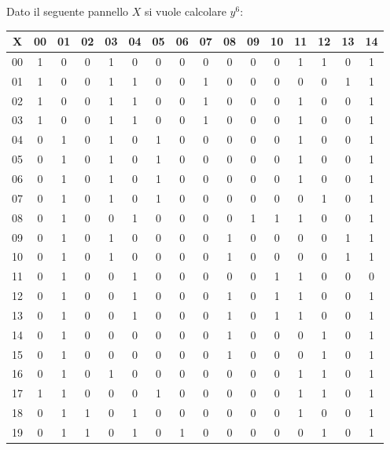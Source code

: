 \newpage
\begin{esempio}
  \label{es:pbwt1}
  Dato il seguente pannello $X$ si vuole calcolare $y^6$:
  \begin{table}[H]
    \centering
    \scriptsize
    \begin{tabular}{c|ccccccccccccccc}
      X & 00 & 01 & 02 & 03 & 04 & 05 & 06 & 07 & 08 & 09 & 10 & 11 & 12 & 13
      & 14 \\
      \hline
      00 & 1 & 0 & 0 & 1 & 0 & 0 & 0 & 0 & 0 & 0 & 0 & 1 & 1 & 0 & 1 \\
      01 & 1 & 0 & 0 & 1 & 1 & 0 & 0 & 1 & 0 & 0 & 0 & 0 & 0 & 1 & 1 \\
      02 & 1 & 0 & 0 & 1 & 1 & 0 & 0 & 1 & 0 & 0 & 0 & 1 & 0 & 0 & 1 \\
      03 & 1 & 0 & 0 & 1 & 1 & 0 & 0 & 1 & 0 & 0 & 0 & 1 & 0 & 0 & 1 \\
      04 & 0 & 1 & 0 & 1 & 0 & 1 & 0 & 0 & 0 & 0 & 0 & 1 & 0 & 0 & 1 \\
      05 & 0 & 1 & 0 & 1 & 0 & 1 & 0 & 0 & 0 & 0 & 0 & 1 & 0 & 0 & 1 \\
      06 & 0 & 1 & 0 & 1 & 0 & 1 & 0 & 0 & 0 & 0 & 0 & 1 & 0 & 0 & 1 \\
      07 & 0 & 1 & 0 & 1 & 0 & 1 & 0 & 0 & 0 & 0 & 0 & 0 & 1 & 0 & 1 \\
      08 & 0 & 1 & 0 & 0 & 1 & 0 & 0 & 0 & 0 & 1 & 1 & 1 & 0 & 0 & 1 \\
      09 & 0 & 1 & 0 & 1 & 0 & 0 & 0 & 0 & 1 & 0 & 0 & 0 & 0 & 1 & 1 \\
      10 & 0 & 1 & 0 & 1 & 0 & 0 & 0 & 0 & 1 & 0 & 0 & 0 & 0 & 1 & 1 \\
      11 & 0 & 1 & 0 & 0 & 1 & 0 & 0 & 0 & 0 & 0 & 1 & 1 & 0 & 0 & 0 \\
      12 & 0 & 1 & 0 & 0 & 1 & 0 & 0 & 0 & 1 & 0 & 1 & 1 & 0 & 0 & 1 \\
      13 & 0 & 1 & 0 & 0 & 1 & 0 & 0 & 0 & 1 & 0 & 1 & 1 & 0 & 0 & 1 \\
      14 & 0 & 1 & 0 & 0 & 0 & 0 & 0 & 0 & 1 & 0 & 0 & 0 & 1 & 0 & 1 \\
      15 & 0 & 1 & 0 & 0 & 0 & 0 & 0 & 0 & 1 & 0 & 0 & 0 & 1 & 0 & 1 \\
      16 & 0 & 1 & 0 & 1 & 0 & 0 & 0 & 0 & 0 & 0 & 0 & 1 & 1 & 0 & 1 \\
      17 & 1 & 1 & 0 & 0 & 0 & 1 & 0 & 0 & 0 & 0 & 0 & 1 & 1 & 0 & 1 \\
      18 & 0 & 1 & 1 & 0 & 1 & 0 & 0 & 0 & 0 & 0 & 0 & 1 & 0 & 0 & 1 \\
      19 & 0 & 1 & 1 & 0 & 1 & 0 & 1 & 0 & 0 & 0 & 0 & 0 & 1 & 0 & 1 

\end{tabular}
\end{table}
\end{esempio}
